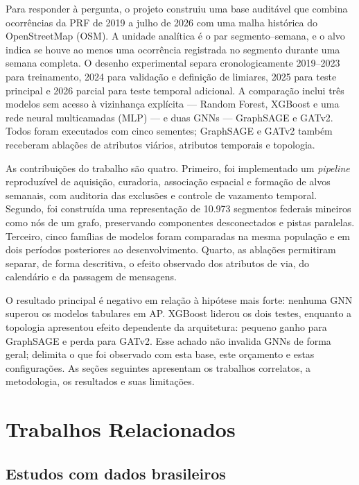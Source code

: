 \documentclass[12pt]{article}
\begin{document}
Para responder à pergunta, o projeto construiu uma base auditável que
combina ocorrências da PRF de 2019 a julho de 2026 com uma malha
histórica do OpenStreetMap (OSM). A unidade analítica é o par
segmento--semana, e o alvo indica se houve ao menos uma ocorrência
registrada no segmento durante uma semana completa. O desenho
experimental separa cronologicamente 2019--2023 para treinamento, 2024
para validação e definição de limiares, 2025 para teste principal e
2026 parcial para teste temporal adicional. A comparação inclui três
modelos sem acesso à vizinhança explícita --- Random Forest, XGBoost e
uma rede neural multicamadas (MLP) --- e duas GNNs --- GraphSAGE e
GATv2. Todos foram executados com cinco sementes; GraphSAGE e GATv2
também receberam ablações de atributos viários, atributos temporais e
topologia.

As contribuições do trabalho são quatro. Primeiro, foi implementado um
\textit{pipeline} reproduzível de aquisição, curadoria, associação
espacial e formação de alvos semanais, com auditoria das exclusões e
controle de vazamento temporal. Segundo, foi construída uma
representação de 10.973 segmentos federais mineiros como nós de um
grafo, preservando componentes desconectados e pistas paralelas.
Terceiro, cinco famílias de modelos foram comparadas na mesma
população e em dois períodos posteriores ao desenvolvimento. Quarto,
as ablações permitiram separar, de forma descritiva, o efeito observado
dos atributos de via, do calendário e da passagem de mensagens.

O resultado principal é negativo em relação à hipótese mais forte:
nenhuma GNN superou os modelos tabulares em AP. XGBoost liderou os dois
testes, enquanto a topologia apresentou efeito dependente da
arquitetura: pequeno ganho para GraphSAGE e perda para GATv2. Esse
achado não invalida GNNs de forma geral; delimita o que foi observado
com esta base, este orçamento e estas configurações. As seções
seguintes apresentam os trabalhos correlatos, a metodologia, os
resultados e suas limitações.

\section{Trabalhos Relacionados}
\label{sec:correlatos}

\subsection{Estudos com dados brasileiros}
\end{document}
